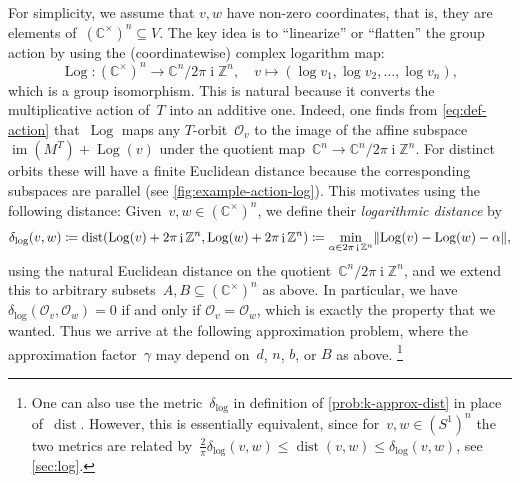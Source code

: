 \documentclass[a4paper,USenglish,cleveref,numberwithinsect]{lipics-v2021}
\DeclareMathOperator{\ii}{i}
\DeclareMathOperator{\Log}{Log}
\DeclareMathOperator{\dist}{dist}
\newcommand{\distLD}{\delta_{\log}}
\DeclareMathOperator{\ran}{im}
\newcommand{\CC}{\mathbb{C}}
\newcommand{\ZZ}{\mathbb{Z}}
\newcommand{\OO}{\ensuremath{\mathcal{O}}}
\DeclarePairedDelimiter\norm{\lVert}{\rVert}
\numberwithin{equation}{section}
\begin{document}
For simplicity, we assume that $v, w$ have non-zero coordinates, that is,
they are elements of~$(\CC^\times)^n \subseteq V$.
The key idea is to ``linearize'' or ``flatten'' the group action by using
the (coordinatewise) complex logarithm map:
\begin{equation}\label{eq:Log-def}
  \Log \colon (\CC^\times)^n \rightarrow \CC^n/2\pi\ii\ZZ^n,
  \quad
  v \mapsto (\log v_1, \log v_2,\dots, \log v_n) ,
\end{equation}
which is a group isomorphism.
This is natural because it converts the multiplicative action of~$T$ into an additive one. %
Indeed, one finds from \eqref{eq:def-action} that~$\Log$ maps any $T$-orbit~$\OO_v$ to
the image of the affine subspace~$\ran(M^T) + \Log(v)$ under the quotient map~$\CC^n \to \CC^{n}/2\pi\ii\ZZ^n$.
For distinct orbits these will have a finite Euclidean distance because
the corresponding subspaces are parallel (see \cref{fig:example-action-log}).
This motivates using the following distance:
Given~$v,w \in (\CC^\times)^n$, we define their \emph{logarithmic distance} by
\begin{equation}
\label{eq:def-distLD}
 \distLD(v,w)
\coloneqq \dist\mleft(\Log(v) + 2 \pi \ii \ZZ^n, \Log(w) + 2 \pi \ii \ZZ^n\mright)
\coloneqq \min_{\alpha \in 2 \pi \ii \ZZ^n} \norm{\Log(v) - \Log(w) - \alpha},
\end{equation}
using the natural Euclidean distance on the quotient~$\CC^{n}/2\pi\ii\ZZ^n$, and we extend this
to arbitrary subsets~$A,B\subseteq (\CC^\times)^n$ as above.
In particular, we have $\distLD(\OO_v,\OO_w)=0$ if and only if $\OO_v=\OO_w$, which is exactly the property that we wanted.
Thus we arrive at the following approximation problem, where the approximation factor~$\gamma$ may depend on~$d$, $n$, $b$, or $B$ as above.%
\footnote{\label{footnote:norm conversion} One can also use the metric~$\distLD$ in definition of \cref{prob:k-approx-dist} in place of~$\dist$. However, this is essentially equivalent, since for~$v,w\in(S^1)^n$ the two metrics are related by~$\frac2\pi \distLD(v,w) \leq \dist(v,w) \leq \distLD(v,w)$, see \cref{sec:log}.
}
\end{document}
